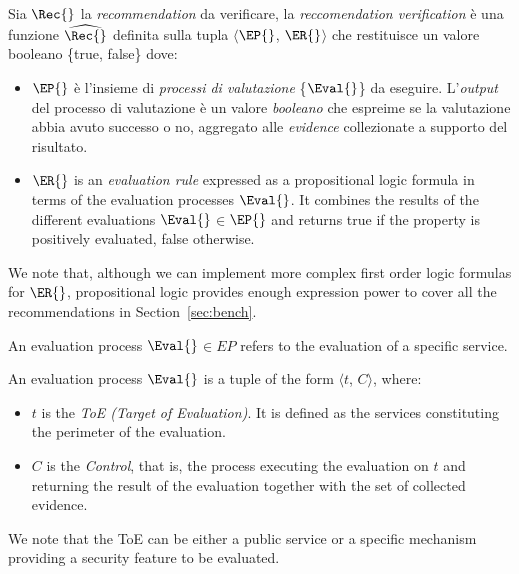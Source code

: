 \documentclass[../main.tex]{subfiles}
\begin{document}
\begin{definition}\label{def:prop}
    Sia $\Rec{}$ la \textit{recommendation} da verificare, la \textit{reccomendation verification} è una funzione $\widehat{\Rec{}}$ definita sulla tupla $\langle$$\EP{}$, $\ER{}$$\rangle$ che restituisce un valore booleano \{true, false\} dove:
\begin{itemize}
    \item $\EP{}$ è l'insieme di \textit{processi di valutazione} \{$\Eval{}$\} da eseguire. L'\textit{output} del processo di valutazione è un valore \textit{booleano} che espreime se la valutazione abbia avuto successo o no, aggregato alle \textit{evidence} collezionate a supporto del risultato.
        \item $\ER{}$ is an \textit{evaluation rule} expressed as a propositional logic formula in terms of the evaluation processes $\Eval{}$. It combines the results of the different evaluations $\Eval{}$$\in$$\EP{}$ and returns true if the property is positively evaluated, false otherwise.
\end{itemize}
\end{definition}
We note that, although we can implement more complex first order logic formulas for $\ER{}$, propositional logic provides enough expression power to cover all the recommendations in Section~\ref{sec:bench}.

An evaluation process $\Eval{}$$\in$$EP{}$ refers to the evaluation of a specific service.
\begin{definition}[$\Eval{}$]\label{def:eval}
An evaluation process $\Eval{}$ is a tuple of the form $\langle$$t$, $C$$\rangle$, where:
\begin{itemize}
	\item $t$ is the \emph{ToE (Target of Evaluation)}. It is defined as the services constituting the perimeter of the evaluation. 
	\item $C$ is the \emph{Control}, that is, the process executing the evaluation on $t$ and returning the result of the evaluation together with the set of collected evidence.
\end{itemize}
\end{definition}

We note that the ToE can be either a public service or a specific mechanism providing a security feature to be evaluated.
\end{document}
